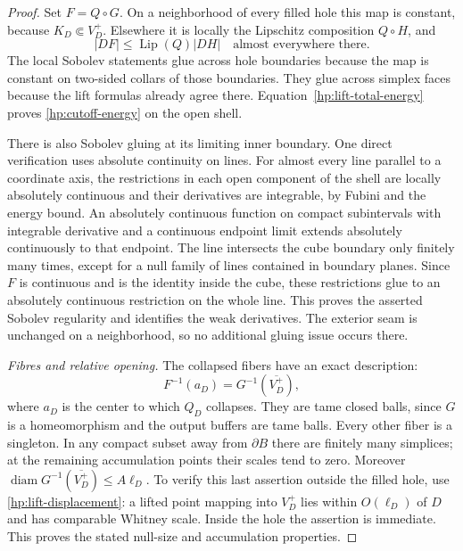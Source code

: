 \documentclass[11pt]{article}
\numberwithin{equation}{section}
\theoremstyle{definition}
\theoremstyle{remark}
\DeclareMathOperator{\Lip}{Lip}
\DeclareMathOperator{\diam}{diam}
\begin{document}
\begin{proof}
Set $F=Q\circ G$.  On a neighborhood of every filled hole this map
is constant, because $K_D\Subset V_D^+$.  Elsewhere it is locally
the Lipschitz composition $Q\circ H$, and
\[
 |DF|\leq\Lip(Q)|DH|\quad\text{almost everywhere there}.
\]
The local Sobolev statements glue across hole boundaries because the
map is constant on two-sided collars of those boundaries.  They glue
across simplex faces because the lift formulas already agree there.
Equation~\eqref{hp:lift-total-energy} proves
\eqref{hp:cutoff-energy} on the open shell.

There is also Sobolev gluing at its limiting inner boundary.  One
direct verification uses absolute continuity on lines.  For almost
every line parallel to a coordinate axis, the restrictions in each
open component of the shell are locally absolutely continuous and
their derivatives are integrable, by Fubini and the energy bound.
An absolutely continuous function on compact subintervals with
integrable derivative and a continuous endpoint limit extends
absolutely continuously to that endpoint.  The line intersects the
cube boundary only finitely many times, except for a null family of
lines contained in boundary planes.  Since $F$ is continuous and is
the identity inside the cube, these restrictions glue to an
absolutely continuous restriction on the whole line.  This proves
the asserted Sobolev regularity and identifies the weak derivatives.
The exterior seam is unchanged on a neighborhood, so no additional
gluing issue occurs there.

\emph{Fibres and relative opening.}
The collapsed fibers have an exact description:
\[
 F^{-1}(a_D)=G^{-1}(\overline{V_D^+}),
\]
where $a_D$ is the center to which $Q_D$ collapses.  They are tame
closed balls, since $G$ is a homeomorphism and the output buffers
are tame balls.  Every other fiber is a singleton.  In any compact
subset away from $\partial B$ there are finitely many simplices;
at the remaining accumulation points their scales tend to zero.
Moreover $\diam G^{-1}(\overline{V_D^+})\leq A\ell_D$.  To verify
this last assertion outside the filled hole, use
\eqref{hp:lift-displacement}: a lifted point mapping into $V_D^+$
lies within $O(\ell_D)$ of $D$ and has comparable Whitney scale.
Inside the hole the assertion is immediate.  This proves the stated
null-size and accumulation properties.


\end{proof}
\end{document}
